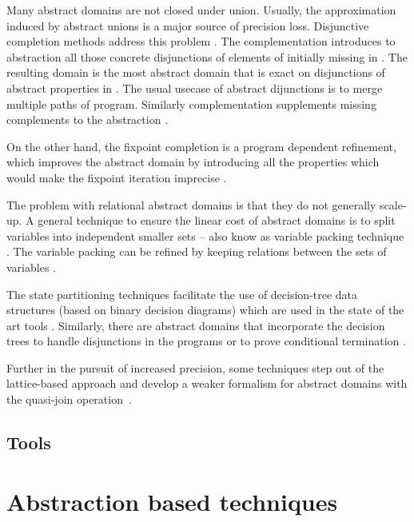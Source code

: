 Many abstract domains are not closed under union. Usually, the approximation
induced by abstract unions is a major source of precision loss. Disjunctive
completion methods address this problem \cite{File1999}. The complementation
introduces to abstraction \domain{} all those concrete disjunctions of elements
of \domain{} initially missing in \domain{}. The resulting domain is the most
abstract domain that is exact on disjunctions of abstract properties in
\domain{}.  The usual usecase of abstract dijunctions is to merge multiple paths
of program.  Similarly complementation supplements missing complements to the
abstraction \cite{Cortesi1995}.

On the other hand, the fixpoint completion is a program dependent refinement,
which improves the abstract domain by introducing all the properties which
would make the fixpoint iteration imprecise \cite{Giacobazzi2000,
Giacobazzi2001}.

The problem with relational abstract domains is that they do not generally
scale-up. A general technique to ensure the linear cost of abstract domains is
to split variables into independent smaller sets -- also know as variable
packing technique \cite{Mine2006}. The variable packing can be refined by
keeping relations between the sets of variables \cite{Bouzaziz2012}.

The state partitioning techniques \cite{Muchnick1981} facilitate the use of
decision-tree data structures (based on binary decision diagrams) which are
used in the state of the art tools \cite{Cousot2010, Bertrane2015}.
Similarly, there are abstract domains that incorporate the decision trees to
handle disjunctions in the programs \cite{Cousot2010a} or to prove conditional
termination \cite{Urban2010}.

Further in the pursuit of increased precision, some techniques step out of the
lattice-based approach and develop a weaker formalism for abstract domains with
the quasi-join operation~\cite{Gange2013}.

\subsection{ Tools }




\section{Abstraction based techniques}
\label{sec:techniques}

